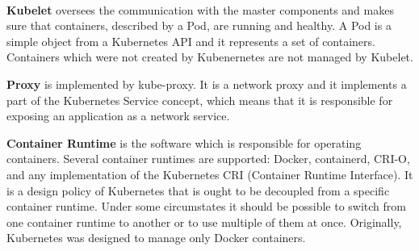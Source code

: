 \documentclass[12pt]{article}
\begin{document}
\paragraph{}
\textbf{Kubelet} oversees the communication with the master components and makes sure that containers, described by a Pod, are running and healthy. A Pod is a simple object from a Kubernetes API and it represents a set of containers. Containers which were not created by Kubenernetes are not managed by Kubelet\cite{book-mastering-k8s,k8s-components}.

\textbf{Proxy} is implemented by kube-proxy. It is a network proxy and it implements a part of the Kubernetes Service concept, which means that it is responsible for exposing an application as a network service\cite{k8s-components}.

\textbf{Container Runtime} is the software which is responsible for operating containers. Several container runtimes are supported: Docker, containerd, CRI-O, and any implementation of the Kubernetes CRI (Container Runtime Interface). It is a design policy of Kubernetes that is ought to be decoupled from a specific container runtime. Under some circumstates it should be possible to switch from one container runtime to another or to use multiple of them at once. Originally, Kubernetes was designed to manage only Docker containers\cite{book-mastering-k8s,k8s-components}.




\printbibliography
\end{document}
